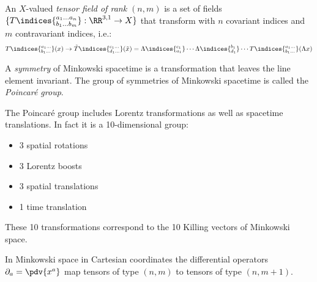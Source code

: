 \documentclass{jknotes} %
\begin{document}
\begin{defn}
    An \(X\)-valued \emph{tensor field of rank \((n,m)\)} is a set of fields \(\{T\indices{^{a_1\dots  a_n}_{b_1\dots b_m}} : \RR^{3,1} \rightarrow X\}\) that transform with \(n\) covariant indices and \(m\) contravariant indices, i.e.:
    \begin{equation}
        T\indices{^{a_1\dots}_{b_1\dots}} (x) \rightarrow \tilde{T}\indices{^{c_1\dots}_{d_1\dots}} (\tilde{x}) = \Lambda\indices{^{c_1}_{a_1}}\cdots\Lambda\indices{_{d_1}^{b_1}}\cdots T\indices{^{a_1\dots}_{b_1\dots}} (\Lambda x)
        \label{}
    \end{equation}
\end{defn}

\begin{defn}
    A \emph{symmetry} of Minkowski spacetime is a transformation that leaves the line element invariant. The group of symmetries of Minkowski spacetime is called the \emph{Poincar\'e group}.
\end{defn}

The Poincar\'e group includes Lorentz transformations as well as spacetime translations. In fact it is a 10-dimensional group:
\begin{itemize}
    \item 3 spatial rotations
    \item 3 Lorentz boosts
    \item 3 spatial translations
    \item 1 time translation
\end{itemize}
These 10 transformations correspond to the 10 Killing vectors of Minkowski space.

In Minkowski space in Cartesian coordinates the differential operators \(\partial_a = \pdv{x^a}\) map tensors of type \((n,m)\) to tensors of type \((n,m+1)\).
\end{document}
